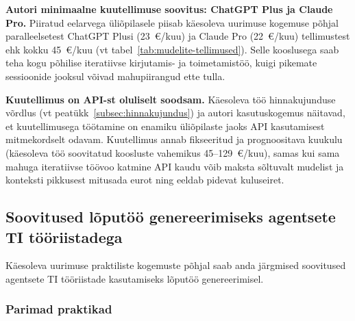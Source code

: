 \textbf{Autori minimaalne kuutellimuse soovitus: ChatGPT Plus ja Claude Pro.} Piiratud eelarvega üliõpilasele piisab käesoleva uurimuse kogemuse põhjal paralleelsetest ChatGPT Plusi  (23~€/kuu) ja Claude Pro (22~€/kuu) tellimustest ehk kokku 45~€/kuu (vt tabel~\ref{tab:mudelite-tellimused}). Selle kooslusega saab teha kogu põhilise iteratiivse kirjutamis- ja toimetamistöö, kuigi pikemate sessioonide jooksul võivad mahupiirangud ette tulla.

\textbf{Kuutellimus on API-st oluliselt soodsam.} Käesoleva töö hinnakujunduse võrdlus (vt peatükk~\ref{subsec:hinnakujundus}) ja autori kasutuskogemus näitavad, et kuutellimusega töötamine on enamiku üliõpilaste jaoks API kasutamisest mitmekordselt odavam. Kuutellimus annab fikseeritud ja prognoositava kuukulu (käesoleva töö soovitatud koosluste vahemikus 45--129~€/kuu), samas kui sama mahuga iteratiivse töövoo katmine API kaudu võib maksta sõltuvalt mudelist ja konteksti pikkusest mitusada eurot ning eeldab pidevat kuluseiret.

\subsection{Soovitused lõputöö genereerimiseks agentsete TI tööriistadega} \label{subsec:agentsed-soovitused}

Käesoleva uurimuse praktiliste kogemuste põhjal saab anda järgmised soovitused agentsete TI tööriistade kasutamiseks lõputöö genereerimisel.

\subsubsection{Parimad praktikad}

